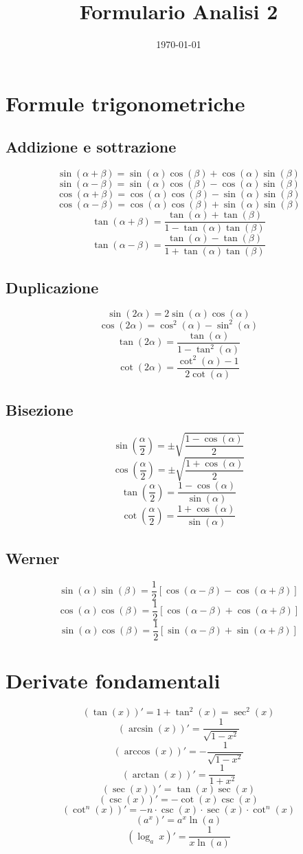 \documentclass[a4paper,portrait,columns=3,5pt]{cheatsheet}
\title{Formulario Analisi 2}
\author{}
\date{\today}
\begin{document}

\section{Formule trigonometriche}
\subsection{Addizione e sottrazione}
$$\sin (\alpha + \beta) = \sin(\alpha) \cos(\beta) + \cos(\alpha)\sin(\beta)$$
$$\sin(\alpha - \beta) = \sin(\alpha) \cos(\beta) - \cos(\alpha)\sin(\beta)$$
$$\cos(\alpha + \beta) = \cos(\alpha) \cos(\beta) - \sin(\alpha) \sin(\beta)$$
$$\cos(\alpha - \beta) = \cos(\alpha) \cos(\beta) + \sin(\alpha) \sin(\beta)$$
$$\tan(\alpha + \beta) = \frac{\tan(\alpha) + \tan(\beta)}{1 - \tan(\alpha)\tan(\beta)}$$
$$\tan(\alpha - \beta) = \frac{\tan(\alpha) - \tan(\beta)}{1 + \tan(\alpha)\tan(\beta)}$$
\subsection{Duplicazione}
$$\sin(2\alpha) = 2\sin(\alpha)\cos(\alpha)$$
$$\cos(2\alpha) = \cos^2 (\alpha) - \sin^2 (\alpha)$$
$$\tan(2\alpha) = \frac{\tan(\alpha)}{1 - \tan^2(\alpha)}$$
$$\cot(2\alpha) = \frac{\cot^2(\alpha) - 1}{2\cot(\alpha)}$$
\subsection{Bisezione}
$$\sin\left(\frac{\alpha}{2}\right) = \pm \sqrt{\frac{1 - \cos(\alpha)}{2}}$$
$$\cos\left(\frac{\alpha}{2}\right) = \pm \sqrt{\frac{1 + \cos(\alpha)}{2}}$$
$$\tan\left(\frac{\alpha}{2}\right) = {\frac{1 - \cos(\alpha)}{\sin(\alpha)}}$$
$$\cot\left(\frac{\alpha}{2}\right) = {\frac{1 + \cos(\alpha)}{\sin(\alpha)}}$$
\subsection{Werner}
$$\sin(\alpha)\sin(\beta) = \frac{1}{2} \left[\cos(\alpha - \beta) - \cos(\alpha + \beta)\right]$$
$$\cos(\alpha)\cos(\beta) = \frac{1}{2} \left[\cos(\alpha - \beta) + \cos(\alpha + \beta)\right]$$
$$\sin(\alpha)\cos(\beta) = \frac{1}{2} \left[\sin(\alpha - \beta) + \sin(\alpha + \beta)\right]$$

\section{Derivate fondamentali}
$$ (\tan(x))' = 1 + \tan^2(x) = \sec^2(x)$$
$$ (\arcsin(x))' = \frac{1}{\sqrt{1 - x^2}}$$
$$ (\arccos(x))' = - \frac{1}{\sqrt{1 - x^2}}$$
$$ (\arctan(x))' = \frac{1}{1 + x^2}$$
$$ (\sec(x))' = \tan(x)\sec(x)$$
$$ (\csc(x))' = -\cot(x)\csc(x)$$
$$ (\cot^n(x))' = - n \cdot \csc(x) \cdot \sec(x) \cdot \cot^n (x)$$
$$ (a^x)' = a^x \ln(a)$$
$$ (\log_a~x )' = \frac{1}{x\ln(a)}$$
\end{document}
